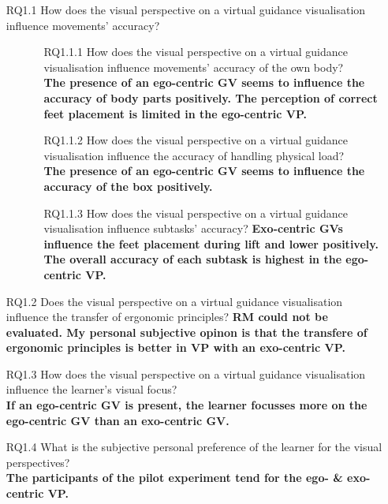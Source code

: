\begin{enumerate}[align=left, leftmargin=0pt, labelindent=\parindent,
	listparindent=\parindent, labelwidth=0pt, itemindent=!]
	\item[RQ1.1] How does the visual perspective on a virtual guidance visualisation influence movements' accuracy?
	\begin{itemize}
		\item[] \begin{itemize}
			\item[RQ1.1.1] How does the visual perspective on a virtual guidance visualisation influence movements' accuracy of the own body?\\
			\textbf{The presence of an ego-centric GV seems to influence the accuracy of body parts positively. The perception of correct feet placement is limited in the ego-centric VP.}
			\item[RQ1.1.2] How does the visual perspective on a virtual guidance visualisation influence the accuracy of handling physical load?\\
			\textbf{The presence of an ego-centric GV seems to influence the accuracy of the box positively.}
			\item[RQ1.1.3] How does the visual perspective on a virtual guidance visualisation influence subtasks' accuracy?
			\textbf{Exo-centric GVs influence the feet placement during lift and lower positively. The overall accuracy of each subtask is highest in the ego-centric VP.}
		\end{itemize}
	\end{itemize}
	
	\item[RQ1.2] Does the visual perspective on a virtual guidance visualisation influence the transfer of ergonomic principles?
	\textbf{RM could not be evaluated. My personal subjective opinon is that the transfere of ergonomic principles is better in VP with an exo-centric VP.}
	\item[RQ1.3] How does the visual perspective on a virtual guidance visualisation influence the learner's visual focus?\\
	\textbf{If an ego-centric GV is present, the learner focusses more on the ego-centric GV than an exo-centric GV.}
	\item[RQ1.4] What is the subjective personal preference of the learner for the visual perspectives?\\
	\textbf{The participants of the pilot experiment tend for the ego- \& exo-centric VP.}
\end{enumerate}


